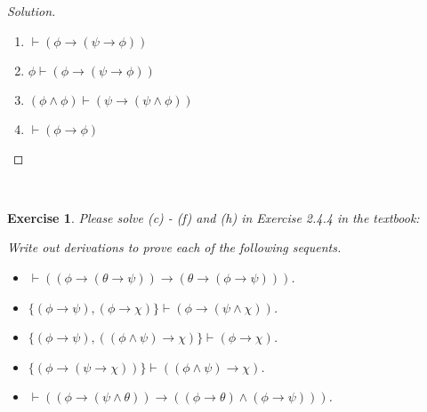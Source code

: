 \documentclass[12pt,a4paper]{article}
\theoremstyle{plain}
\newtheorem{exercise}{Exercise}
\begin{document}
\begin{proof}[Solution]\ 
    \begin{enumerate}
        \item $ \vdash ( \phi \rightarrow ( \psi \rightarrow \phi ) )$
        \item $\phi \vdash ( \phi \rightarrow ( \psi \rightarrow \phi ) )$
        \item $(\phi \wedge \phi) \vdash ( \psi \rightarrow (\psi \wedge \phi ) )$
        \item $\vdash ( \phi \rightarrow \phi )$
    \end{enumerate}
\end{proof}

\ \\
\begin{exercise}
Please solve (c) - (f) and (h) in Exercise 2.4.4 in the textbook:

Write out derivations to prove each of the following sequents.
%
\begin{itemize}

\item[(c)] $\vdash ( ( \phi \rightarrow ( \theta \rightarrow \psi ) ) \rightarrow ( \theta \rightarrow ( \phi \rightarrow \psi ) ) )$.

\item[(d)] $\{ ( \phi \rightarrow \psi ) , ( \phi \rightarrow \chi) \} \vdash ( \phi \rightarrow ( \psi \wedge \chi ))$.

\item[(e)] $\{ ( \phi \rightarrow \psi ) , ( ( \phi \wedge \psi ) \rightarrow \chi ) \} \vdash ( \phi \rightarrow \chi )$.

\item[(f)] $\{ ( \phi \rightarrow ( \psi \rightarrow \chi )) \} \vdash (( \phi \wedge \psi) \rightarrow \chi)$.


\item[(h)] $\vdash (( \phi \rightarrow ( \psi \wedge \theta )) \rightarrow (( \phi \rightarrow \theta ) \wedge ( \phi \rightarrow \psi )))$.

\end{itemize}
\end{exercise}
\end{document}
